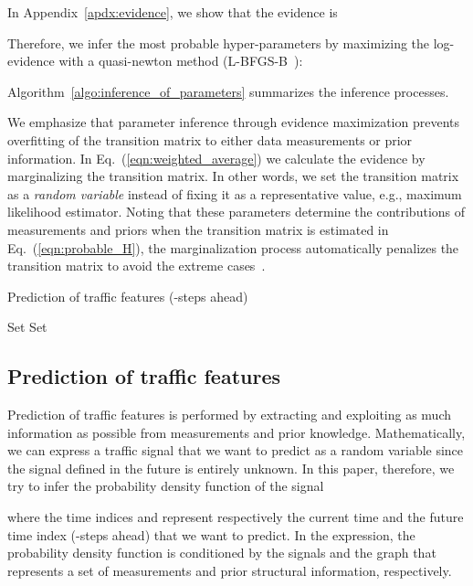 \documentclass[journal]{IEEEtran}
\begin{document}
In Appendix~\ref{apdx:evidence}, we show that the evidence is

Therefore, we infer the most probable hyper-parameters by maximizing the log-evidence with a quasi-newton method (L-BFGS-B~\cite{byrd1995limited}):

Algorithm~\ref{algo:inference_of_parameters} summarizes the inference processes.



We emphasize that parameter inference through evidence maximization prevents overfitting of the transition matrix to either data measurements or prior information.
In Eq.~(\ref{eqn:weighted_average}) we calculate the evidence by marginalizing the transition matrix. In other words, we set the transition matrix as a {\it{random variable}} instead of fixing it as a representative value, e.g., maximum likelihood estimator. Noting that these parameters determine the contributions of measurements and priors when the transition matrix is estimated in Eq.~(\ref{eqn:probable_H}), the marginalization process automatically penalizes the transition matrix to avoid the extreme cases~\cite{mackay1992bayesian}.




\begin{algorithm}[t!]
\caption{Prediction of traffic features (-steps ahead)}\label{algo:prediction}
\begin{algorithmic} 
\State Set 
\For{}
\State Set  
\EndFor
\State \\
\Return 
\EndFunction
\end{algorithmic}
\end{algorithm}

\subsection{Prediction of traffic features}
Prediction of traffic features is performed by extracting and exploiting as much information as possible from measurements and prior knowledge. Mathematically, we can express a traffic signal that we want to predict as a random variable since the signal defined in the future is entirely unknown. In this paper, therefore, we try to infer the probability density function of the signal 
 
where the time indices  and  represent respectively the current time and the future time index (-steps ahead) that we want to predict. In the expression, the probability density function is conditioned by the signals  and the graph  that represents a set of measurements and prior structural information, respectively.
\end{document}
